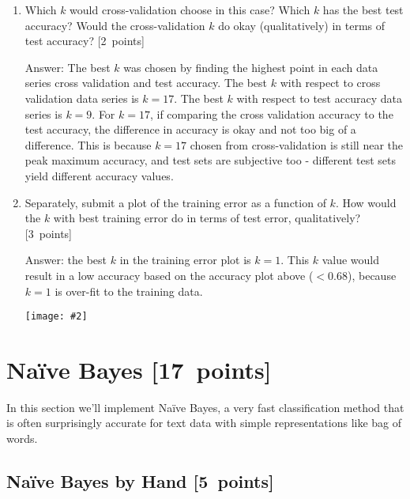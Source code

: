 \documentclass{article}
\newcommand{\blu}[1]{{\textcolor{blu}{#1}}}
\newcommand{\gre}[1]{\textcolor{gre}{#1}}
\newcommand\ans[1]{\par\gre{Answer: #1}}
\let\ask\blu
\newcommand\pts[1]{\textcolor{pointscolour}{[#1~points]}}
\newcommand{\centerfig}[2]{\begin{center}\texttt{[image: \#2]}\end{center}}
\begin{document}
\begin{enumerate}
        \item Which $k$ would cross-validation choose in this case? Which $k$ has the best test accuracy? Would the cross-validation $k$ do okay (qualitatively) in terms of test accuracy? \pts{2}
        \ans{ The best $k$ was chosen by finding the highest point in each data series cross validation and test accuracy. The best $k$ with respect to cross validation data series is $k = 17$. The best $k$ with respect to test accuracy data series is $k = 9$. For $k = 17$, if comparing the cross validation accuracy to the test accuracy, the difference in accuracy is okay and not too big of a difference. This is because $k = 17$ chosen from cross-validation is still near the peak maximum accuracy, and test sets are subjective too - different test sets yield different accuracy values.}
        \newpage

        \item Separately, \ask{submit a plot of the training error as a function of $k$. How would the $k$ with best training error do in terms of test error, qualitatively?} \pts{3}

        \ans{ the best $k$ in the training error plot is $k = 1$. This $k$ value would result in a low accuracy based on the accuracy plot above ($< 0.68$), because $k = 1$ is over-fit to the training data.
        \centerfig{.7}{figs/q2_training error for ks.pdf}
        }
    \end{enumerate}



    \clearpage
    \section{Na\"ive Bayes \pts{17}}

    In this section we'll implement Na\"ive Bayes, a very fast classification method that is often surprisingly accurate for text data with simple representations like bag of words.


    \subsection{Na\"ive Bayes by Hand \pts{5}}
\end{document}
